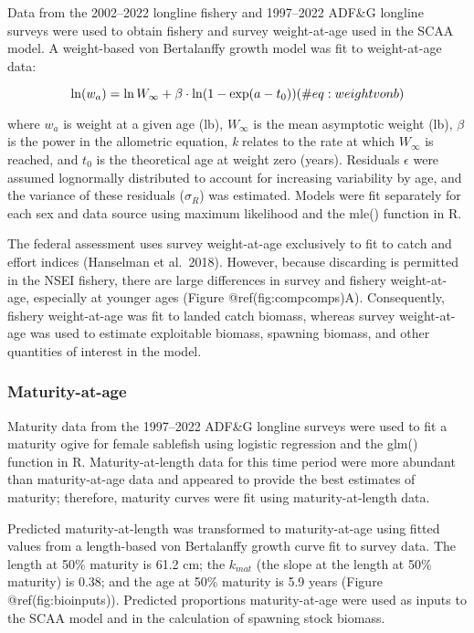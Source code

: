\documentclass[
]{article}
\begin{document}
Data from the 2002--2022 longline fishery and 1997--2022 ADF\&G longline
surveys were used to obtain fishery and survey weight-at-age used in the
SCAA model. A weight-based von Bertalanffy growth model was fit to
weight-at-age data:

\[
\begin{equation}
\ln(w_a)=\ln W_{\infty}+\beta \cdot \ln (1-\exp (a-t_0)) \\
(\#eq:weightvonb)
\end{equation}
\]

where \(w_a\) is weight at a given age (lb), \(W_{\infty}\) is the mean
asymptotic weight (lb), \(\beta\) is the power in the allometric
equation, \emph{k} relates to the rate at which \(W_{\infty}\) is
reached, and \(t_0\) is the theoretical age at weight zero (years).
Residuals \(\epsilon\) were assumed lognormally distributed to account
for increasing variability by age, and the variance of these residuals
(\(\sigma_R\)) was estimated. Models were fit separately for each sex
and data source using maximum likelihood and the mle() function in R.

The federal assessment uses survey weight-at-age exclusively to fit to
catch and effort indices (Hanselman et al.~2018). However, because
discarding is permitted in the NSEI fishery, there are large differences
in survey and fishery weight-at-age, especially at younger ages (Figure
@ref(fig:compcomps)A). Consequently, fishery weight-at-age was fit to
landed catch biomass, whereas survey weight-at-age was used to estimate
exploitable biomass, spawning biomass, and other quantities of interest
in the model.

\hypertarget{maturity-at-age}{%
\subsubsection{Maturity-at-age}\label{maturity-at-age}}

Maturity data from the 1997--2022 ADF\&G longline surveys were used to
fit a maturity ogive for female sablefish using logistic regression and
the glm() function in R. Maturity-at-length data for this time period
were more abundant than maturity-at-age data and appeared to provide the
best estimates of maturity; therefore, maturity curves were fit using
maturity-at-length data.

Predicted maturity-at-length was transformed to maturity-at-age using
fitted values from a length-based von Bertalanffy growth curve fit to
survey data. The length at 50\% maturity is 61.2 cm; the \(k_{mat}\)
(the slope at the length at 50\% maturity) is 0.38; and the age at 50\%
maturity is 5.9 years (Figure @ref(fig:bioinputs)). Predicted
proportions maturity-at-age were used as inputs to the SCAA model and in
the calculation of spawning stock biomass.
\end{document}
